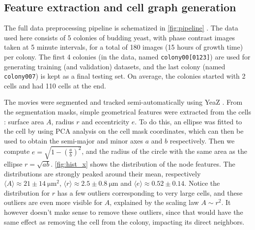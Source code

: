 \documentclass[10pt,conference,compsocconf,a4paper]{IEEEtran}
\newcommand{\nunit}[1]{\ \si{#1}}
\newcommand{\avg}[1]{\langle{#1}\rangle}
\newcommand*{\shortautoref}[1]{%
	\begingroup
	\def\equationautorefname{\textsc{Eq.}}%
	\def\tableautorefname{\textsc{Tab.}}%
	\def\figureautorefname{\textsc{Fig.}}%
	\autoref{#1}%
	\endgroup
}
\begin{document}
	\subsection{Feature extraction and cell graph generation}

		The full data preprocessing pipeline is schematized in \shortautoref{fig:pipeline}. The data used here consists of 5 colonies of budding yeast, with phase contrast images taken at 5 minute intervals, for a total of 180 images (15 hours of growth time) per colony. The first 4 colonies (in the data, named \texttt{colony00[0123]}) are used for generating training (and validation) datasets, and the last colony (named \texttt{colony007}) is kept as a final testing set. On average, the colonies started with 2 cells and had 110 cells at the end.

		The movies were segmented and tracked semi-automatically using YeaZ \cite{dietler_convolutional_2020}. From the segmentation masks, simple geometrical features were extracted from the cells : surface area $A$, radius $r$ and eccentricity $e$. To do this, an ellipse was fitted to the cell by using PCA analysis on the cell mask coordinates, which can then be used to obtain the semi-major and minor axes $a$ and $b$ respectively. Then we compute $e=\sqrt{1-(\frac{a}{b})^2}$, and the radius of the circle with the same area as the ellipse $r=\sqrt{ab}$. \shortautoref{fig:hist_x} shows the distribution of the node features. The distributions are strongly peaked around their mean, respectively $\avg{A} \approx 21 \pm 14 \nunit{\micro \meter \squared}$, $\avg{r} \approx 2.5 \pm 0.8 \nunit{\micro \meter}$ and $\avg{e} \approx 0.52 \pm 0.14$. Notice the distribution for $r$ has a few outliers corresponding to very large cells, and these outliers are even more visible for $A$, explained by the scaling law $A \sim r^2$. It however doesn't make sense to remove these outliers, since that would have the same effect as removing the cell from the colony, impacting its direct neighbors.
\end{document}
